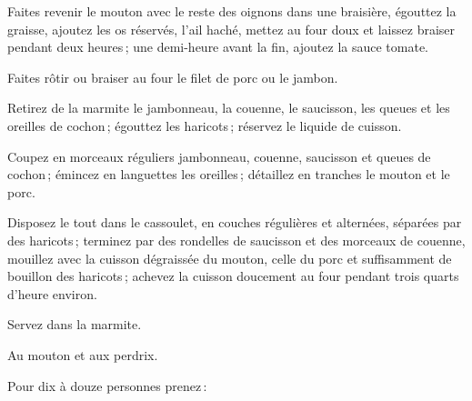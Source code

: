 Faites revenir le mouton avec le reste des oignons dans une braisière, égouttez
la graisse, ajoutez les os réservés, l'ail haché, mettez au four doux et
laissez braiser pendant deux heures ; une demi-heure avant la fin, ajoutez la
sauce tomate.

Faites rôtir ou braiser au four le filet de porc ou le jambon.

Retirez de la marmite le jambonneau, la couenne, le saucisson, les queues et
les oreilles de cochon ; égouttez les haricots ; réservez le liquide de
cuisson.

Coupez en morceaux réguliers jambonneau, couenne, saucisson et queues de
cochon ; émincez en languettes les oreilles ; détaillez en tranches le mouton
et le porc.

Disposez le tout dans le cassoulet, en couches régulières et alternées,
séparées par des haricots ; terminez par des rondelles de saucisson et des
morceaux de couenne, mouillez avec la cuisson dégraissée du mouton, celle du
porc et suffisamment de bouillon des haricots ; achevez la cuisson doucement au
four pendant trois quarts d'heure environ.

Servez dans la marmite.

\sk

Au mouton et aux perdrix.

\medskip

Pour dix à douze personnes prenez :

